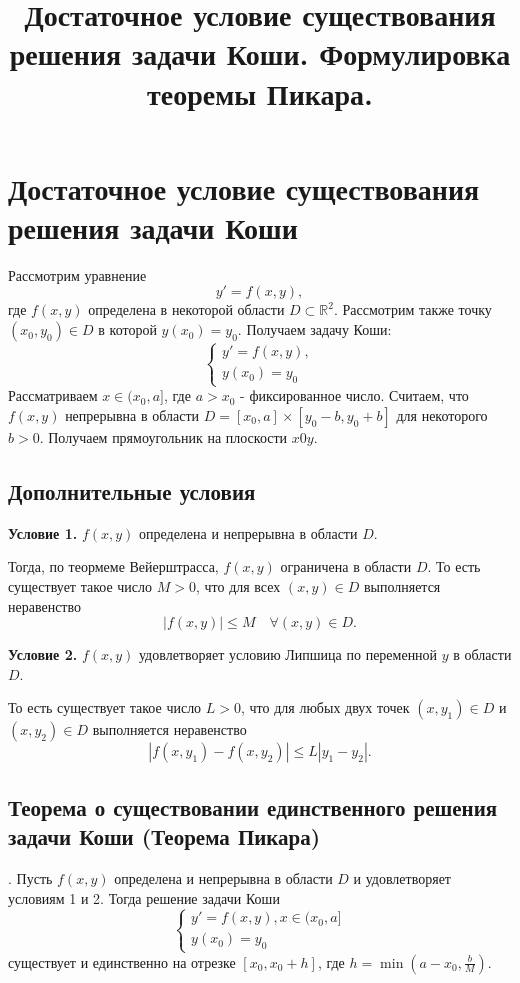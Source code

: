 \documentclass[12pt]{article}
\title{Достаточное условие существования решения задачи Коши. Формулировка теоремы Пикара.}
\begin{document}
\maketitle

\section{Достаточное условие существования решения задачи Коши}
Рассмотрим уравнение
\begin{equation}\label{eq:general-ode}
    y' = f(x, y),
\end{equation}
где $f(x, y)$ определена в некоторой области $D \subset \mathbb{R}^2$.
Рассмотрим также точку $(x_0, y_0) \in D$ в которой $y(x_0) = y_0$.
Получаем задачу Коши:
\begin{equation}\label{eq:initial-condition-2}
    \begin{cases}
        y' = f(x, y), \\
        y(x_0) = y_0
    \end{cases}
\end{equation}
Рассматриваем $x\in (x_0, a]$, где $a > x_0$ - фиксированное число.
Считаем, что $f(x, y)$ непрерывна в области $D = [x_0, a] \times [y_0 - b, y_0 + b]$ для некоторого $b > 0$.
Получаем прямоугольник на плоскости $x0y$.

\subsection{Дополнительные условия}
\textbf{Условие 1.} $f(x, y)$ определена и непрерывна в области $D$.

Тогда, по теормеме Вейерштрасса, $f(x, y)$ ограничена в области $D$.
То есть существует такое число $M > 0$, что для всех $(x, y) \in D$ выполняется неравенство
\begin{equation}\label{eq:bound-f}
    |f(x, y)| \leq M \quad \forall (x, y) \in D.
\end{equation}

\textbf{Условие 2.} $f(x, y)$ удовлетворяет условию Липшица по переменной $y$ в области $D$.

То есть существует такое число $L > 0$, что для любых двух точек $(x, y_1) \in D$ и $(x, y_2) \in D$
выполняется неравенство
\begin{equation}\label{eq:lipshitz}
    |f(x, y_1) - f(x, y_2)| \leq L |y_1 - y_2|.
\end{equation}

\subsection{Теорема о существовании единственного решения задачи Коши (Теорема Пикара)}.
Пусть $f(x, y)$ определена и непрерывна в области $D$ и удовлетворяет условиям 1 и 2.
Тогда решение задачи Коши
\begin{equation}\label{eq:cauchy-problem-2}
    \begin{cases}
        y' = f(x, y), x \in (x_0, a] \\
        y(x_0) = y_0
    \end{cases}
\end{equation}
существует и единственно на отрезке
$[x_0, x_0 + h]$, где $h = \min\left(a - x_0, \frac{b}{M}\right)$.
\end{document}

